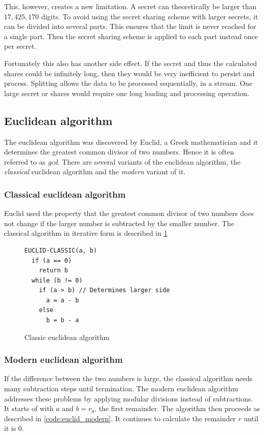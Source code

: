 This, however, creates a new limitation. A secret can theoretically be larger
than $17,425,170$ digits. To avoid using the secret sharing scheme with larger
secrets, it can be divided into several parts. This ensures that the limit
is never reached for a single part. Then the secret sharing scheme is applied to
each part instead once per secret.

Fortunately this also has another side effect. If the secret and thus the
calculated shares could be infinitely long, then they would be very inefficient
to persist and process. Splitting allows the data to be processed sequentially,
in a stream. One large secret or shares would require one long loading and
processing operation.

\subsection{Euclidean algorithm}

The euclidean algorithm was discovered by Euclid, a Greek mathematician and it
determines the greatest common divisor of two numbers.
Hence it is often referred to as \textit{gcd}. There are several variants
of the euclidean algorithm, the \textit{classical} euclidean algorithm and the
\textit{modern} variant of it.

\subsubsection{Classical euclidean algorithm}

Euclid used the property that the greatest common divisor of two numbers does
not change if the larger number is subtracted by the smaller number. The classical
algorithm in iterative form is described in \ref{code:euclid_classic}

\begin{figure}
\begin{lstlisting}
EUCLID-CLASSIC(a, b)
  if (a == 0)
    return b
  while (b != 0)
    if (a > b) // Determines larger side
      a = a - b
    else
      b = b - a
\end{lstlisting}
\caption{Classic euclidean algorithm}
\label{code:euclid_classic}
\end{figure}

\subsubsection{Modern euclidean algorithm}

If the difference between the two numbers is large, the classical algorithm
needs many subtraction steps until termination. The modern euclidean algorithm
addresses these problems by applying modular divisions instead of subtractions.
It starts of with $a$ and $b = r_0$, the first remainder. The algorithm then
proceeds as described in \ref{code:euclid_modern}. It continues to
calculate the remainder $r$ until it is $0$.

